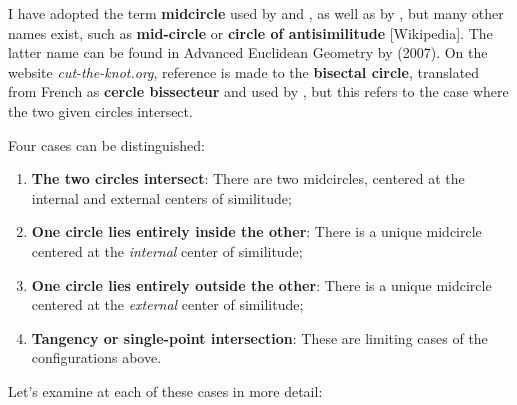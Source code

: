 I have adopted the term \textbf{midcircle} used by  and , as well as by , but many other names exist, such as \textbf{mid-circle} or \textbf{circle of antisimilitude} [Wikipedia]. The latter name can be found in Advanced Euclidean Geometry by  (2007). On the website \textit{cut-the-knot.org}, reference is made to the \textbf{bisectal circle}, translated from French as \textbf{cercle bissecteur} and used by , but this refers to the case where the two given circles intersect.

\noindent
Four cases can be distinguished:

\begin{enumerate}[label=(\roman*)]
  \item \textbf{The two circles intersect}: There are two midcircles, centered at the internal and external centers of similitude;
  \item \textbf{One circle lies entirely inside the other}: There is a unique midcircle centered at the \emph{internal} center of similitude;
  \item \textbf{One circle lies entirely outside the other}: There is a unique midcircle centered at the \emph{external} center of similitude;
  \item \textbf{Tangency or single-point intersection}: These are limiting cases of the configurations above.
\end{enumerate}


\vspace{1em}
Let’s examine at each of these cases in more detail:

